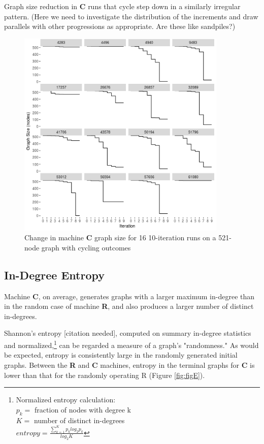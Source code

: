 \documentclass{tufte-handout}
\begin{document}
Graph size reduction in \textbf{C} runs that cycle step down in a similarly
irregular pattern. (Here we need to investigate the distribution of the
increments and draw parallels with other progressions as appropriate. Are
these like sandpiles?)

\begin{figure}[htb]
\includegraphics[height=10cm]{ccyc_stepdown.png}
\caption{Change in machine \textbf{C} graph size for 16 10-iteration runs
on a 521-node graph with cycling outcomes}
\label{fig:CCyclingDynamics}
\end{figure}

\clearpage

\subsection{In-Degree Entropy}

Machine \textbf{C}, on average, generates graphs with a larger 
maximum in-degree than in the random case of machine \textbf{R}, and also produces a
larger number of distinct in-degrees.

Shannon's entropy [citation needed], computed on summary in-degree statistics and
normalized,\footnote{
Normalized entropy calculation: \\
\vspace{2mm}
$p_{k}=$ fraction of nodes with degree k \\
$K=$ number of distinct in-degrees \\
\vspace{2mm}
$entropy = \frac{\sum_{k=1}^{K} p_{k} log_{2}p_{k}} {log_{2}K}$}
can be regarded a measure of a graph's "randomness."
As would be expected, entropy is consistently large in the randomly generated
initial graphs. Between the \textbf{R} and \textbf{C} machines, entropy in the terminal
graphs for \textbf{C} is lower than that for the randomly operating R (Figure \ref{fig:figE}).
\end{document}
